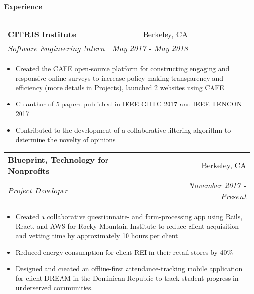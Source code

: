\documentclass[11pt,letterpaper]{article}
\makeatletter
\newenvironment{topic}[1]
    {
    {\Large \centerline{#1}}
    \vspace*{0.03in}
    \hrule 
    \vspace*{0.05in}
    }
    {}
\newenvironment{event}
    {
    \begin{tabular*}{\textwidth}{l@{\extracolsep{\fill}}r}
    }
    {
    \end{tabular*}
    }
\makeatother
\begin{document}
\begin{topic}{\textbf{Experience}}
        \begin{event}
            \textbf{CITRIS Institute} & Berkeley, CA \\
            \emph{Software Engineering Intern} & \emph{May 2017 - May 2018}
        \end{event}
            \begin{itemize}
                \item Created the CAFE open-source platform for constructing engaging and responsive online surveys to increase policy-making transparency and efficiency (more details in Projects), launched 2 websites using CAFE
                \item Co-author of 5 papers published in IEEE GHTC 2017 and IEEE TENCON 2017
                \item Contributed to the development of a collaborative filtering algorithm to determine the novelty of opinions
            \end{itemize}


        \begin{event}
            \textbf{Blueprint, Technology for Nonprofits} & Berkeley, CA \\
            \emph{Project Developer} & \emph{November 2017 - Present}
        \end{event}
            \begin{itemize}
                \item Created a collaborative questionnaire- and form-processing app using Rails, React, and AWS for Rocky Mountain Institute to reduce client acquisition and vetting time by approximately 10 hours per client
                \item Reduced energy consumption for client REI in their retail stores by 40\% 
                \item Designed and created an offline-first attendance-tracking mobile application for client DREAM in the Dominican Republic to track student progress in underserved communities.
            \end{itemize}


\end{topic}
\end{document}
